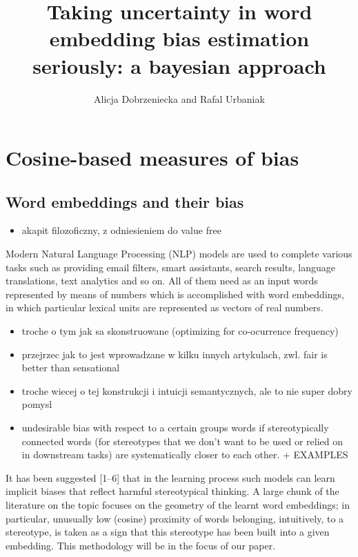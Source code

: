 \documentclass[
  10pt,
  dvipsnames,enabledeprecatedfontcommands, twocolumn]{scrartcl}
\title{Taking uncertainty in word embedding bias estimation seriously: a
bayesian approach}
\author{Alicja Dobrzeniecka and Rafal Urbaniak}
\date{}
\providecommand{\tightlist}{%
  \setlength{\itemsep}{0pt}\setlength{\parskip}{0pt}}
\begin{document}
\maketitle

\hypertarget{cosine-based-measures-of-bias}{%
\section{Cosine-based measures of
bias}\label{cosine-based-measures-of-bias}}

\hypertarget{word-embeddings-and-their-bias}{%
\subsection{Word embeddings and their
bias}\label{word-embeddings-and-their-bias}}

\begin{itemize}
\tightlist
\item
  akapit filozoficzny, z odniesieniem do value free
\end{itemize}

Modern Natural Language Processing (NLP) models are used to complete
various tasks such as providing email filters, smart assistants, search
results, language translations, text analytics and so on. All of them
need as an input words represented by means of numbers which is
accomplished with word embeddings, in which particular lexical units are
represented as vectors of real numbers.

\begin{itemize}
\item
  troche o tym jak sa skonstruowane (optimizing for co-ocurrence
  frequency)
\item
  przejrzec jak to jest wprowadzane w kilku innych artykulach, zwl. fair
  is better than sensational
\item
  troche wiecej o tej konstrukcji i intuicji semantycznych, ale to nie
  super dobry pomysl
\item
  undesirable bias with respect to a certain groups words if
  stereotypically connected words (for stereotypes that we don't want to
  be used or relied on in downstream tasks) are systematically closer to
  each other. + EXAMPLES
\end{itemize}

It has been suggested {[}1--6{]} that in the learning process such
models can learn implicit biases that reflect harmful stereotypical
thinking. A large chunk of the literature on the topic focuses on the
geometry of the learnt word embeddings; in particular, unusually low
(cosine) proximity of words belonging, intuitively, to a stereotype, is
taken as a sign that this stereotype has been built into a given
embedding. This methodology will be in the focus of our paper.
\end{document}
